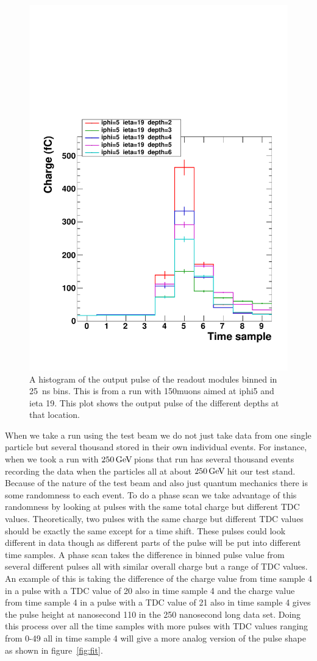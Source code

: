 \begin{figure}
\centering
\includegraphics[width=0.7\linewidth]{Figures/Pulse.pdf}
\caption{A histogram of the output pulse of the readout modules binned in 25~ns bins. This is from a run with 150\GeV muons aimed at iphi5 and ieta 19. This plot shows the output pulse of the different depths at that location.}
\label{fig:PulSh}
\end{figure}

When we take a run using the test beam we do not just take data from one single particle but several thousand stored in their own individual events. For instance, when we took a run with $250{\,\text{Ge\hspace{-.08em}V\hspace{-0.16em}}}$ pions that run has several thousand events recording the data when the particles all at about $250{\,\text{Ge\hspace{-.08em}V\hspace{-0.16em}}}$ hit our test stand. Because of the nature of the test beam and also just quantum mechanics there is some randomness to each event. To do a phase scan we take advantage of this randomness by looking at pulses with the same total charge but different TDC values. Theoretically, two pulses with the same charge but different TDC values should be exactly the same except for a time shift. These pulses could look different in data though as different parts of the pulse will be put into different time samples. A phase scan takes the difference in binned pulse value from several different pulses all with similar overall charge but a range of TDC values. An example of this is taking the difference of the charge value from time sample 4 in a pulse with a TDC value of 20 also in time sample 4 and the charge value from time sample 4 in a pulse with a TDC value of 21 also in time sample 4 gives the pulse height at nanosecond 110 in the 250 nanosecond long data set. Doing this process over all the time samples with more pulses with TDC values ranging from 0-49 all in time sample 4 will give a more analog version of the pulse shape as shown in figure~\ref{fig:fit}.

